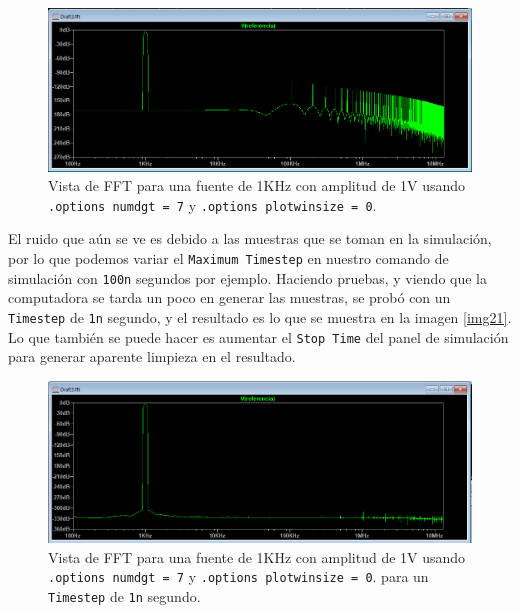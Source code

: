 \documentclass[a4paper]{article} %
\begin{document}
\begin{figure} %
	\centering %
	\includegraphics[scale=0.4]{IMAGENES/img20} %
	\caption{Vista de FFT para una fuente de 1KHz con amplitud de 1V usando \texttt{.options numdgt = 7} y \texttt{.options plotwinsize = 0}.} %
	\label{img20} %
\end{figure} %

El ruido que aún se ve es debido a las muestras que se toman en la simulación, por lo que podemos variar el \texttt{Maximum Timestep} en nuestro comando de simulación con \texttt{100n} segundos por ejemplo. Haciendo pruebas, y viendo que la computadora se tarda un poco en generar las muestras, se probó con un \texttt{Timestep} de \texttt{1n} segundo, y el resultado es lo que se muestra en la imagen \eqref{img21}. Lo que también se puede hacer es aumentar el \texttt{Stop Time} del panel de simulación para generar aparente limpieza en el resultado.

\begin{figure} %
	\centering %
	\includegraphics[scale=0.4]{IMAGENES/img21} %
	\caption{Vista de FFT para una fuente de 1KHz con amplitud de 1V usando \texttt{.options numdgt = 7} y \texttt{.options plotwinsize = 0}. para un \texttt{Timestep} de \texttt{1n} segundo.} %
	\label{img21} %
\end{figure} %
\end{document}
